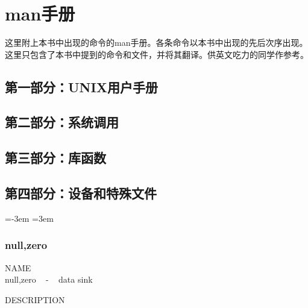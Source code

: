 
\newcommand{\manpage}[1]{
\parindent=0pt
\leftskip=0pt
\subsection{#1}
\parindent=-3.5em
\leftskip=3.5em
}

\chapter{man手册}

这里附上本书中出现的命令的man手册。各条命令以本书中出现的先后次序出现。这里只包含了本书中提到的命令和文件，并将其翻译。供英文吃力的同学作参考。


\section{第一部分：UNIX用户手册}

\section{第二部分：系统调用}

\section{第三部分：库函数}

\section{第四部分：设备和特殊文件}

\parindent=-3em
\leftskip=3em

\subsection{null,zero}


NAME \\
	null,zero ~ - ~ data sink

DESCRIPTION\\
	\lipsum[1]
